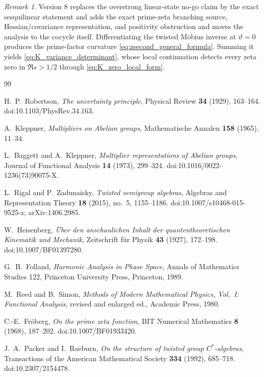 \documentclass[11pt]{amsart}
\numberwithin{equation}{section}
\theoremstyle{plain}
\theoremstyle{definition}
\theoremstyle{remark}
\newtheorem{remark}[theorem]{Remark}
\begin{document}
\begin{remark}
\label{rem:history_v5}
Version 8 replaces the overstrong linear-state no-go claim by the exact sesquilinear statement and adds the exact prime-zeta branching source, Hessian/covariance representation, and positivity obstruction and moves the analysis to
the cocycle itself. Differentiating the twisted M\"obius inverse at
\(\vartheta=0\) produces the prime-factor curvature
\eqref{eq:zsecond_general_formula}. Summing it yields
\eqref{eq:K_variance_determinant}, whose local continuation detects every
zeta zero in \(\Re s>1/2\) through \eqref{eq:K_zero_local_form}.
\end{remark}

\begin{thebibliography}{99}

H.~P.~Robertson,
\emph{The uncertainty principle},
Physical Review \textbf{34} (1929), 163--164.
doi:10.1103/PhysRev.34.163.

A.~Kleppner,
\emph{Multipliers on Abelian groups},
Mathematische Annalen \textbf{158} (1965), 11--34.

L.~Baggett and A.~Kleppner,
\emph{Multiplier representations of Abelian groups},
Journal of Functional Analysis \textbf{14} (1973), 299--324.
doi:10.1016/0022-1236(73)90075-X.

L.~Rigal and P.~Zadunaisky,
\emph{Twisted semigroup algebras},
Algebras and Representation Theory \textbf{18} (2015), no.~5, 1155--1186.
doi:10.1007/s10468-015-9525-z; arXiv:1406.2985.

W.~Heisenberg,
\emph{\"Uber den anschaulichen Inhalt der quantentheoretischen Kinematik und
Mechanik},
Zeitschrift f\"ur Physik \textbf{43} (1927), 172--198.
doi:10.1007/BF01397280.

G.~B.~Folland,
\emph{Harmonic Analysis in Phase Space},
Annals of Mathematics Studies 122,
Princeton University Press, Princeton, 1989.

M.~Reed and B.~Simon,
\emph{Methods of Modern Mathematical Physics, Vol.~I: Functional Analysis},
revised and enlarged ed., Academic Press, 1980.


C.-E.~Fr\"oberg,
\emph{On the prime zeta function},
BIT Numerical Mathematics \textbf{8} (1968), 187--202.
doi:10.1007/BF01933420.

J.~A.~Packer and I.~Raeburn,
\emph{On the structure of twisted group $C^*$-algebras},
Transactions of the American Mathematical Society \textbf{334} (1992), 685--718.
doi:10.2307/2154478.


\end{thebibliography}
\end{document}

